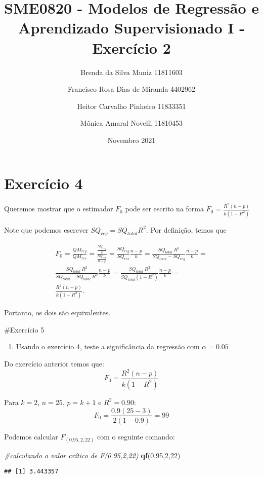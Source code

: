 \documentclass[
]{article}
\title{SME0820 - Modelos de Regressão e Aprendizado Supervisionado I -
Exercício 2}
\author{Brenda da Silva Muniz 11811603 \and Francisco Rosa Dias de Miranda 4402962 \and Heitor Carvalho Pinheiro 11833351 \and Mônica Amaral Novelli 11810453}
\date{Novembro 2021}
\newenvironment{Shaded}{\begin{snugshade}}{\end{snugshade}}
\newcommand{\CommentTok}[1]{\textcolor[rgb]{0.56,0.35,0.01}{\textit{#1}}}
\newcommand{\DecValTok}[1]{\textcolor[rgb]{0.00,0.00,0.81}{#1}}
\newcommand{\FloatTok}[1]{\textcolor[rgb]{0.00,0.00,0.81}{#1}}
\newcommand{\KeywordTok}[1]{\textcolor[rgb]{0.13,0.29,0.53}{\textbf{#1}}}
\newcommand{\NormalTok}[1]{#1}
\providecommand{\tightlist}{%
  \setlength{\itemsep}{0pt}\setlength{\parskip}{0pt}}
\begin{document}
\maketitle

\hypertarget{exercuxedcio-4}{%
\section{Exercício 4}\label{exercuxedcio-4}}

Queremos mostrar que o estimador \(F_0\) pode ser escrito na forma
\(F_0 = \frac{R^2(n-p)}{k(1-R^2)}\)

Note que podemos escrever \(SQ_{reg} = SQ_{total} R^2\). Por definição,
temos que

\[\begin{aligned}
F_0 = \frac{QM_{reg}}{QM_{res}} = \frac{\frac{SQ_{reg}}{k}}{\frac{SQ_{res}}{n-p}} = \frac{SQ_{reg}}{SQ_{res}} \frac{n-p}k = \frac{SQ_{total}\ R^2}{SQ_{total} - SQ_{reg}}  \frac{n-p}{k} = \\
\frac{SQ_{total}\ R^2}{SQ_{total} - SQ_{total}\ R^2}  \frac{n-p}{k} = 
\frac{SQ_{total}\ R^2}{SQ_{total} ( 1- R^2)}  \frac{n-p}{k} = \\
\frac{R^2(n-p)}{k (1- R^2)}.
\end{aligned}\]

Portanto, os dois são equivalentes.

\#Exercício 5

\begin{enumerate}
\def\labelenumi{\alph{enumi})}
\tightlist
\item
  Usando o exercício 4, teste a significância da regressão com
  \(\alpha = 0.05\)
\end{enumerate}

Do exercício anterior temos que: \[F_0 = \frac{R^2(n-p)}{k (1- R^2)}\]

Para \(k = 2\), \(n = 25\), \(p=k+1\) e \(R^2 = 0.90\):
\[F_0 = \frac{0.9(25-3)}{2 (1- 0.9)} = 99\]

Podemos calcular \(F_{(0.95,2,22)}\) com o seguinte comando:

\begin{Shaded}
\begin{Highlighting}[]
\CommentTok{#calculando o valor crítico de F(0.95,2,22)}
\KeywordTok{qf}\NormalTok{(}\FloatTok{0.95}\NormalTok{,}\DecValTok{2}\NormalTok{,}\DecValTok{22}\NormalTok{)}
\end{Highlighting}
\end{Shaded}

\begin{verbatim}
## [1] 3.443357
\end{verbatim}
\end{document}
